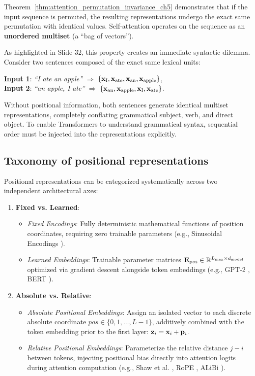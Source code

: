 \documentclass[../../../main.tex]{subfiles}
\begin{document}
Theorem~\ref{thm:attention_permutation_invariance_ch5} demonstrates that if the input sequence is permuted, the resulting representations undergo the exact same permutation with identical values. Self-attention operates on the sequence as an \textbf{unordered multiset} (a ``bag of vectors'').

As highlighted in Slide 32, this property creates an immediate syntactic dilemma. Consider two sentences composed of the exact same lexical units:
\begin{center}
\textbf{Input 1}: \textit{``I ate an apple''} \quad $\Longrightarrow$ \quad $\{\mathbf{x}_{\text{I}}, \mathbf{x}_{\text{ate}}, \mathbf{x}_{\text{an}}, \mathbf{x}_{\text{apple}}\}$, \\
\textbf{Input 2}: \textit{``an apple, I ate''} \quad $\Longrightarrow$ \quad $\{\mathbf{x}_{\text{an}}, \mathbf{x}_{\text{apple}}, \mathbf{x}_{\text{I}}, \mathbf{x}_{\text{ate}}\}$.
\end{center}
Without positional information, both sentences generate identical multiset representations, completely conflating grammatical subject, verb, and direct object. To enable Transformers to understand grammatical syntax, sequential order must be injected into the representations explicitly.

\subsection{Taxonomy of positional representations}
\label{subsec:pe_taxonomy}

Positional representations can be categorized systematically across two independent architectural axes:
\begin{enumerate}
    \item \textbf{Fixed vs. Learned}:
    \begin{itemize}
        \item \emph{Fixed Encodings}: Fully deterministic mathematical functions of position coordinates, requiring zero trainable parameters (e.g., Sinusoidal Encodings \cite{vaswani2017}).
        \item \emph{Learned Embeddings}: Trainable parameter matrices $\mathbf{E}_{\text{pos}} \in \mathbb{R}^{L_{\max} \times d_{\text{model}}}$ optimized via gradient descent alongside token embeddings (e.g., GPT-2 \cite{radford2019}, BERT \cite{devlin2019}).
    \end{itemize}
    \item \textbf{Absolute vs. Relative}:
    \begin{itemize}
        \item \emph{Absolute Positional Embeddings}: Assign an isolated vector to each discrete absolute coordinate $pos \in \{0, 1, \dots, L-1\}$, additively combined with the token embedding prior to the first layer: $\mathbf{z}_i = \mathbf{x}_i + \mathbf{p}_i$.
        \item \emph{Relative Positional Embeddings}: Parameterize the relative distance $j - i$ between tokens, injecting positional bias directly into attention logits during attention computation (e.g., Shaw et al. \cite{shaw2018}, RoPE \cite{su2024roformer}, ALiBi \cite{press2022alibi}).
    \end{itemize}
\end{enumerate}
\end{document}
